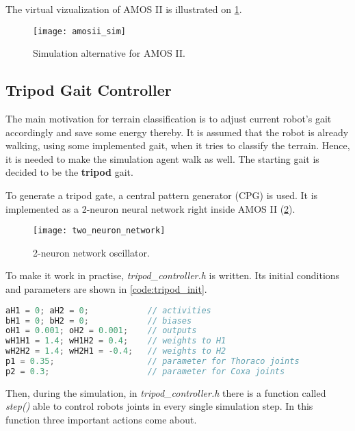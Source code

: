 The virtual vizualization of AMOS II is illustrated on \cref{img:amosii_sim}.

\begin{figure}[H]
  \centering
  \texttt{[image: amosii\_sim]}
  \caption{Simulation alternative for AMOS II.}
  \label{img:amosii_sim}
\end{figure}

\subsection{Tripod Gait Controller} \label{ssec:tripod_gait_controller}
The main motivation for terrain classification is to adjust current robot's gait accordingly and save some energy thereby. It is assumed that the robot is already walking, using some implemented gait, when it tries to classify the terrain. Hence, it is needed to make the simulation agent walk as well. The starting gait is decided to be the \textbf{tripod} gait.

To generate a tripod gate, a central pattern generator (CPG) is used. \citep{unpub:ai3_lec3} It is implemented as a 2-neuron neural network right inside AMOS II (\cref{img:two_neuron_network}).

\begin{figure}[H]
  \centering
  \texttt{[image: two\_neuron\_network]}
  \caption{2-neuron network oscillator. \citep{unpub:ai3_lec3}}
  \label{img:two_neuron_network}
\end{figure}

To make it work in practise, \textit{tripod\_controller.h} is written. Its initial conditions and parameters are shown in \cref{code:tripod_init}.

\begin{lstlisting}[language=C++, caption={Initialization in tripod\_controller.h}, label=code:tripod_init]
aH1 = 0; aH2 = 0;            // activities
bH1 = 0; bH2 = 0;            // biases
oH1 = 0.001; oH2 = 0.001;    // outputs
wH1H1 = 1.4; wH1H2 = 0.4;    // weights to H1
wH2H2 = 1.4; wH2H1 = -0.4;   // weights to H2
p1 = 0.35;                   // parameter for Thoraco joints
p2 = 0.3;                    // parameter for Coxa joints
\end{lstlisting}

Then, during the simulation, in \textit{tripod\_controller.h} there is a function called \textit{step()} able to control robots joints in every single simulation step. In this function three important actions come about.

